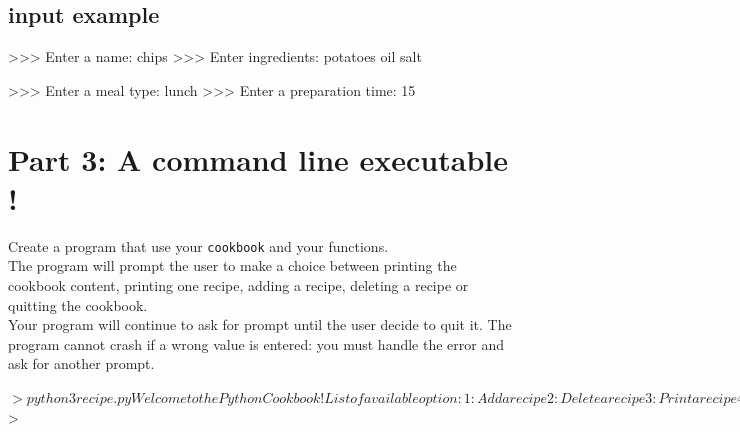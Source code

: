\documentclass{42-en}
\begin{document}
\subsection*{input example}
\begin{42console}
>>> Enter a name:
chips
>>> Enter ingredients:
potatoes
oil
salt

>>> Enter a meal type:
lunch
>>> Enter a preparation time:
15
\end{42console}

\section*{Part 3: A command line executable !}

Create a program that use your \texttt{cookbook} and your functions.\\

The program will prompt the user to make a choice between printing the cookbook content, printing one recipe, adding a recipe, deleting a recipe or quitting the cookbook.\\

Your program will continue to ask for prompt until the user decide to quit it. The program cannot crash if a wrong value is entered: you must handle the error and ask for another prompt.

\begin{42console}
$> python3 recipe.py
Welcome to the Python Cookbook !
List of available option:
   1: Add a recipe
   2: Delete a recipe
   3: Print a recipe
   4: Print the cookbook
   5: Quit

Please select an option:
>> 3

Please enter a recipe name to get its details:
>> cake

Recipe for cake:
   Ingredients list: ['flour', 'sugar', 'eggs']
   To be eaten for dessert.
   Takes 60 minutes of cooking.

Please select an option:
>> Hello

Sorry, this option does not exist.
List of available option:
   1: Add a recipe
   2: Delete a recipe
   3: Print a recipe
   4: Print the cookbook
   5: Quit

Please select an option:
>> 5

Cookbook closed. Goodbye !
$>
\end{42console}


\newpage
\end{document}
